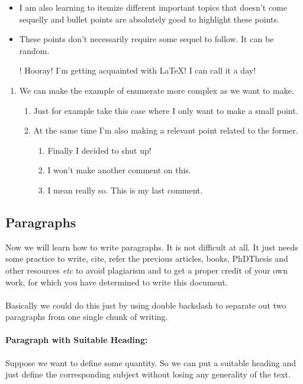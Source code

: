\documentclass[onecolumn,12pt]{article}
\begin{document}
\begin{itemize}
\item I am also learning to itemize different important topics that doesn't come sequelly and bullet points are absolutely good to highlight these points.
\item These points don't necessarily require some sequel to follow. It can be random.
\item[!] Hooray! I'm getting acquainted with LaTeX! I can call it a day!
\end{itemize}
\begin{enumerate}
	\item We can make the example of enumerate more complex as we want to make.
	\begin{enumerate}
	\item Just for example take this case where I only want to make a small point.
	\item At the same time I'm also making a relevant point related to the former.
	    \begin{enumerate}
	    \item Finally I decided to shut up!
	    \item I won't make another comment on this.
	    \item I mean really so. This is my last comment.
	    \end{enumerate}
	\end{enumerate}	
\end{enumerate}

\subsection{Paragraphs}
Now we will learn how to write paragraphs. It is not difficult at all. It just needs some practice to write, cite, refer the previous articles\cite{bhmeadd}, books, PhDThesis\cite{bhatam} and other 	resources {\it etc} to avoid plagiarism and to get a proper credit of your own work, for which you have determined to write this document. \\ \ \\
Basically we could do this just by using double backslash to separate out two paragraphs from one single chunk of writing. 
\paragraph{Paragraph with Suitable Heading:}
Suppose we want to define some quantity. So we can put a suitable heading and just define the corresponding subject without losing any generality of the text.
\end{document}
